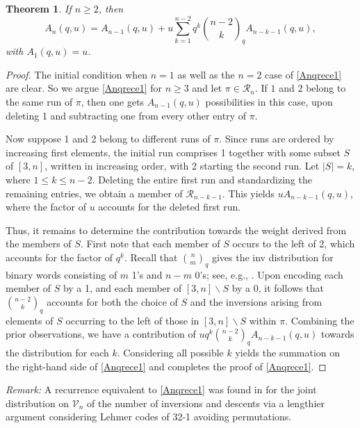 \documentclass[11pt,a4paper]{article}
\newtheorem{theorem}{Theorem}[section]
\begin{document}
\begin{theorem}\label{Anqrec}
If $n \geq 2$, then
\begin{equation}\label{Anqrece1}
A_n(q,u)=A_{n-1}(q,u)+u\sum_{k=1}^{n-2}q^k\binom{n-2}{k}_qA_{n-k-1}(q,u),
\end{equation}
with $A_1(q,u)=u$.
\end{theorem}
\begin{proof}
The initial condition when $n=1$ as well as the $n=2$ case of \eqref{Anqrece1} are clear.  So we argue \eqref{Anqrece1} for $n \geq 3$ and let $\pi \in \mathcal{R}_n$.  If $1$ and $2$ belong to the same run of $\pi$, then one gets $A_{n-1}(q,u)$ possibilities  in this case, upon deleting 1 and subtracting one from every other entry of $\pi$.

Now suppose 1 and 2 belong to different runs of $\pi$.  Since runs are ordered by increasing first elements, the initial run comprises 1 together with some subset $S$ of $[3,n]$, written in increasing order, with 2 starting the second run.  Let $|S|=k$, where $1 \leq k \leq n-2$.  Deleting the entire first run and standardizing the remaining entries, we obtain a member of $\mathcal{R}_{n-k-1}$.  This yields $uA_{n-k-1}(q,u)$, where the factor of $u$ accounts for the deleted first run.

Thus, it remains to determine the contribution towards the weight derived from the members of $S$.  First note that each member of $S$ occurs to the left of 2, which accounts for the factor of $q^k$.  Recall that $\binom{n}{m}_q$ gives the inv distribution for binary words consisting of $m$ 1's and $n-m$ 0's; see, e.g., \cite[p.\,26]{Stan}.  Upon encoding each member of $S$ by a 1, and each member of $[3,n]\backslash S$ by a 0, it follows that $\binom{n-2}{k}_q$ accounts for both the choice of $S$ and the inversions arising from elements of $S$ occurring to the left of those in $[3,n]\backslash S$ within $\pi$.  Combining the prior observations, we have a contribution of $uq^k\binom{n-2}{k}_qA_{n-k-1}(q,u)$ towards the distribution for each $k$.  Considering all possible $k$ yields the summation on the right-hand side of \eqref{Anqrece1} and completes the proof of \eqref{Anqrece1}.
\end{proof}

\noindent \emph{Remark:}  A recurrence equivalent to \eqref{Anqrece1} was found in \cite[Theorem 2.5]{QP} for the joint distribution on $\mathcal{V}_n$ of the number of inversions and descents via a lengthier argument considering Lehmer codes of 32-1 avoiding permutations.
\end{document}
